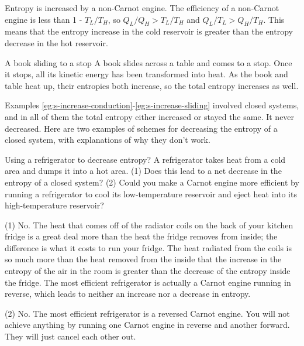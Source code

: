 \begin{eg}{Entropy is increased by a non-Carnot engine.}
The efficiency of a non-Carnot engine is less than 1 -
$ T_L/ T_H$, so $Q_L/ Q_{H} >  T_{L}/ T_H$
 and $Q_L/ T_{L} >  Q_{H}/ T_H$. This means that
the entropy increase in the cold reservoir is greater than
the entropy decrease in the hot reservoir.
\end{eg}


\begin{eg}{A book sliding to a stop}\label{eg:s-increase-sliding}
A book slides across a table and comes to a stop. Once it stops, all its
kinetic energy has been transformed into heat. As the book and
table heat up, their entropies both increase, so the total entropy increases
as well.
\end{eg}

Examples \ref{eg:s-increase-conduction}-\ref{eg:s-increase-sliding} involved closed systems, and in all of
them the total entropy either increased or stayed the same. It
never decreased. Here are two examples of schemes for
decreasing the entropy of a closed system, with explanations
of why they don't work.

\begin{eg}{Using a refrigerator to decrease entropy?}
\egquestion
A refrigerator takes heat from a cold area and
dumps it into a hot area. (1) Does this lead to a net
decrease in the entropy of a closed system? (2) Could you
make a Carnot engine more efficient by running a
refrigerator to cool its low-temperature reservoir and
eject heat into its high-temperature reservoir?

\eganswer
(1) No. The heat that comes off of the radiator
coils on the back of your kitchen fridge
is a great deal more than the heat the fridge removes from
inside; the difference is what it costs to run your fridge.
The heat radiated from the coils is so much more than the
heat removed from the inside that the increase in the
entropy of the air in the room is greater than the decrease
of the entropy inside the fridge. The most efficient
refrigerator is actually a Carnot engine running in reverse,
which leads to neither an increase
nor a decrease in entropy.

(2) No. The most efficient refrigerator is a reversed Carnot
engine. You will not achieve anything by running one Carnot
engine in reverse and another forward. They will just cancel
each other out.
\end{eg}


